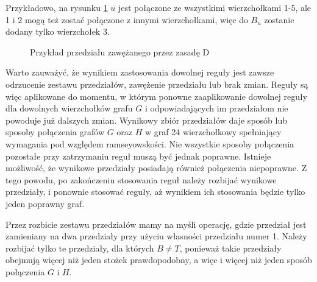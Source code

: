 Przykładowo, na rysunku \ref{zasadaD2} $u$ jest połączone ze wszystkimi wierzchołkami 1-5, ale 1 i 2 mogą też zostać połączone z innymi wierzchołkami, więc do
$B_u$ zostanie dodany tylko wierzchołek 3.   
\begin{figure}[H]
  \centering
 \caption{Przykład przedziału zawężanego przez zasadę D}
 \label{zasadaD2}
 \end{figure}

Warto zauważyć, że wynikiem zastosowania dowolnej reguły jest zawsze odrzucenie zestawu przedziałów, zawężenie przedziału lub brak zmian. Reguły są więc aplikowane do momentu, w którym ponowne zaaplikowanie dowolnej reguły dla dowolnych wierzchołków grafu $G$ i odpowiadających im przedziałom nie powoduje już dalszych zmian. Wynikowy zbiór przedziałów daje sposób lub sposoby połączenia grafów $G$ oraz $H$ w graf 24 wierzchołkowy spełniający wymagania pod względem ramseyowskości. Nie wszystkie sposoby połączenia pozostałe przy zatrzymaniu reguł muszą być jednak poprawne. Istnieje możliwość, że wynikowe przedziały posiadają również połączenia niepoprawne. Z tego powodu, po zakończeniu stosowania reguł należy rozbijać wynikowe przedziały, i ponownie stosować reguły, aż wynikiem ich stosowania będzie tylko jeden poprawny graf.

Przez rozbicie zestawu przedziałów mamy na myśli operację, gdzie przedział jest zamieniany na dwa przedziały przy użyciu własności przedziału numer 1. Należy rozbijać tylko te przedziały, dla których $B \neq T$, ponieważ takie przedziały obejmują więcej niż jeden stożek prawdopodobny, a więc i więcej niż jeden sposób połączenia $G$ i $H$.

